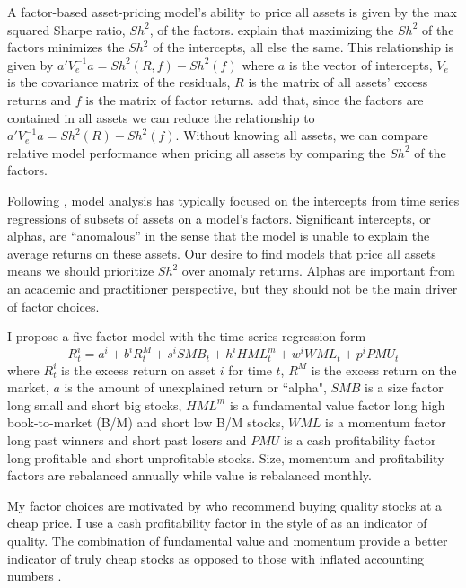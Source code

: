 

A factor-based asset-pricing model’s ability to price all assets is given by the max
squared Sharpe ratio, $Sh^2$, of the factors. \textcite{gibbons1989test} explain that
maximizing the $Sh^2$ of the factors minimizes the $Sh^2$ of the intercepts, all else the
same. This relationship is given by $a'V_e^{-1}a=Sh^2(R, f) -Sh^2(f)$ where $a$ is
the vector of intercepts, $V_e$ is the covariance matrix of the residuals, $R$ is the
matrix of all assets’ excess returns and $f$ is the matrix of factor returns.
\textcite{barillas2016alpha} add that, since the factors are contained in all assets we
can reduce the relationship to $a'V_e^{-1}a = Sh^2(R)-Sh^2(f)$. Without knowing all
assets, we can compare relative model performance when pricing all assets by comparing the
$Sh^2$ of the factors.

Following \textcite{jensen1968performance}, model analysis has typically focused on the
intercepts from time series regressions of subsets of assets on a model’s factors.
Significant intercepts, or alphas, are ``anomalous” in the sense that the model is unable
to explain the average returns on these assets. Our desire to find models that price all
assets means we should prioritize $Sh^2$ over anomaly returns. Alphas are important from
an academic and practitioner perspective, but they should not be the main driver of factor
choices.

I propose a five-factor model with the time series regression form
\begin{equation}
\label{eq:m1}
R_t^i=a^i+b^iR_t^M+s^iSMB_t+h^iHML_t^m+w^iWML_t+p^iPMU_t
\end{equation}
where
$R_t^i$ is the excess return on asset $i$ for time $t$,
$R^M$ is the excess return on the market,
$a$ is the amount of unexplained return or ``alpha",
$SMB$ is a size factor long small and short big stocks,
$HML^m$ is a fundamental value factor long high book-to-market (B/M) and short low B/M stocks,
$WML$ is a momentum factor long past winners and short past losers and
$PMU$ is a cash profitability factor long profitable and short unprofitable stocks.
Size, momentum and profitability factors are rebalanced annually while value is rebalanced monthly.

My factor choices are motivated by \textcite{graham1934security} who recommend buying
quality stocks at a cheap price. I use a cash profitability factor in the style of
\textcite{ball2016accruals} as an indicator of quality. The combination of fundamental
value and momentum provide a better indicator of truly cheap stocks as opposed to those
with inflated accounting numbers \textcite{kok2017facts}.

